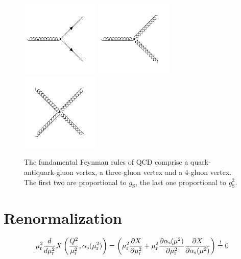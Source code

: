 \begin{figure}[htb] 
    \centering
    \includegraphics[width=0.33\textwidth]{figures/drawings/feynman/gqq.pdf}\hfill
    \includegraphics[width=0.33\textwidth]{figures/drawings/feynman/ggg.pdf}\hfill
    \includegraphics[width=0.33\textwidth]{figures/drawings/feynman/gggg.pdf}\hfill
    \caption[Fundamental vertices of QCD]{The fundamental Feynman rules of QCD
    comprise a quark-antiquark-gluon vertex, a three-gluon vertex and a 4-gluon
    vertex. The first two are proportional to $g_\mathrm{S}$, the last one
    proportional to $g_\mathrm{S}^2$.} 
    \label{fig:fundamental_couplings} 
\end{figure}



\section{Renormalization}

\begin{equation} 
    \mu_{\mathrm{r}}^2 \frac{d}{d \mu_{\mathrm{r}}^2} X \left(\frac{Q^2}{\mu_{\mathrm{r}}^2},\alpha_\mathrm{s}(\mu_{\mathrm{r}}^2)\right) = \left(
    \mu_{\mathrm{r}}^2 \frac{\partial X}{\partial \mu_{\mathrm{r}}^2} + \mu_{\mathrm{r}}^2 \frac{\partial
    \alpha_\mathrm{s}(\mu^2)}{\partial \mu_{\mathrm{r}}^2} \frac{\partial X}{\partial \alpha_\mathrm{s}(\mu^2)} \right) \stackrel{!}{=} 0 
\end{equation}


